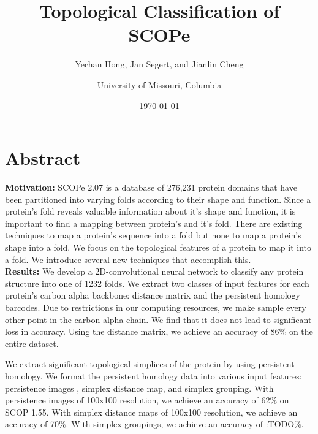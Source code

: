 \documentclass[12pt, a4paper, twocolumn, fullpage]{article}
\title{Topological Classification of SCOPe}
\author{Yechan Hong, Jan Segert, and Jianlin Cheng
\and University of Missouri, Columbia}
\date{\today}
\theoremstyle{plain}
\theoremstyle{definition}
\theoremstyle{remark}
\begin{document}
\maketitle

\section*{Abstract}

\textbf{Motivation:} SCOPe 2.07 is a database of 276,231 protein domains that have been partitioned into varying folds according to their shape and function. Since a protein's fold reveals valuable information about it's shape and function, it is important to find a mapping between protein's and it's fold. There are existing techniques to map a protein's sequence into a fold \cite{deepsf} but none to map a protein's shape into a fold. We focus on the topological features of a protein to map it into a fold. We introduce several new techniques that accomplish this.
\\
\textbf{Results:} We develop a 2D-convolutional neural network to classify any protein structure into one of 1232 folds. 
We extract two classes of input features for each protein's carbon alpha backbone: distance matrix and the persistent homology barcodes. Due to restrictions in our computing resources, we make sample every other point in the carbon alpha chain. We find that it does not lead to significant loss in accuracy.
Using the distance matrix, we achieve an accuracy of 86\% on the entire dataset.

We extract significant topological simplices of the protein by using persistent homology. We format the persistent homology data into various input features: persistence images \cite{persistenceImages}, simplex distance map, and simplex grouping.  With persistence images of 100x100 resolution, we achieve an accuracy of 62\% on SCOP 1.55. With simplex distance maps of 100x100 resolution, we achieve an accuracy of 70\%. With simplex groupings, we achieve an accuracy of :TODO\%.
    

\end{document}
